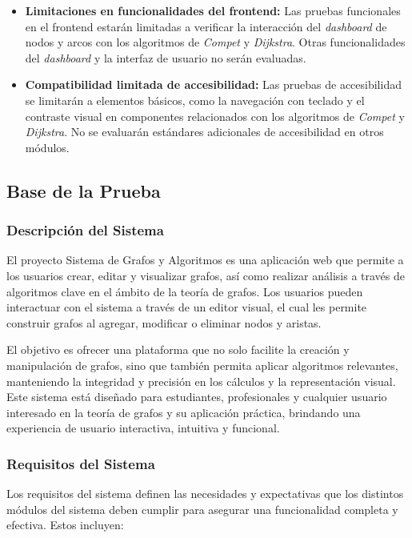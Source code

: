 \documentclass[stu, 12pt, letterpaper, donotrepeattitle, floatsintext, natbib]{apa7}
\begin{document}
\begin{itemize}
    \item \textbf{Limitaciones en funcionalidades del frontend:} Las pruebas funcionales en el frontend estarán limitadas a verificar la interacción del \textit{dashboard} de nodos y arcos con los algoritmos de \textit{Compet} y \textit{Dijkstra}. Otras funcionalidades del \textit{dashboard} y la interfaz de usuario no serán evaluadas.

    \item \textbf{Compatibilidad limitada de accesibilidad:} Las pruebas de accesibilidad se limitarán a elementos básicos, como la navegación con teclado y el contraste visual en componentes relacionados con los algoritmos de \textit{Compet} y \textit{Dijkstra}. No se evaluarán estándares adicionales de accesibilidad en otros módulos.
\end{itemize}


\subsection{Base de la Prueba}
\subsubsection{Descripción del Sistema}
El proyecto Sistema de Grafos y Algoritmos es una aplicación web que permite a los usuarios crear, editar y visualizar grafos, así como realizar análisis a través de algoritmos clave en el ámbito de la teoría de grafos. Los usuarios pueden interactuar con el sistema a través de un editor visual, el cual les permite construir grafos al agregar, modificar o eliminar nodos y aristas.

\noindent El objetivo es ofrecer una plataforma que no solo facilite la creación y manipulación de grafos, sino que también permita aplicar algoritmos relevantes, manteniendo la integridad y precisión en los cálculos y la representación visual. Este sistema está diseñado para estudiantes, profesionales y cualquier usuario interesado en la teoría de grafos y su aplicación práctica, brindando una experiencia de usuario interactiva, intuitiva y funcional.

\subsubsection{Requisitos del Sistema}
Los requisitos del sistema definen las necesidades y expectativas que los distintos módulos del sistema deben cumplir para asegurar una funcionalidad completa y efectiva. Estos incluyen:
\end{document}
